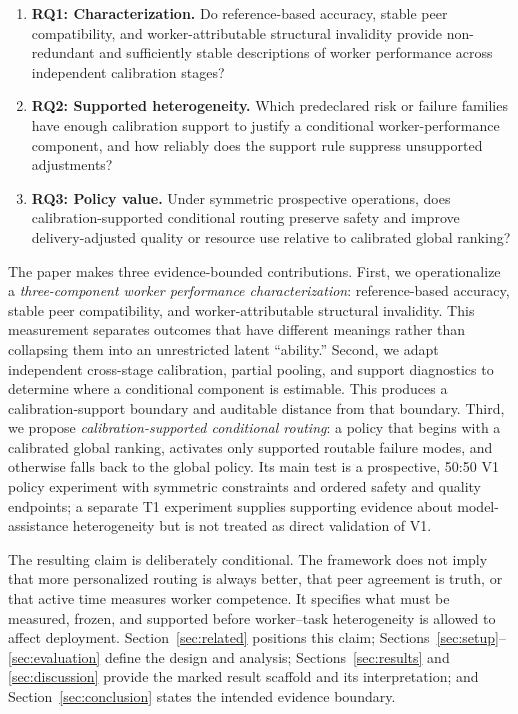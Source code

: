 \begin{enumerate}
  \item \textbf{RQ1: Characterization.} Do reference-based accuracy, stable peer compatibility, and worker-attributable structural invalidity provide non-redundant and sufficiently stable descriptions of worker performance across independent calibration stages?
  \item \textbf{RQ2: Supported heterogeneity.} Which predeclared risk or failure families have enough calibration support to justify a conditional worker-performance component, and how reliably does the support rule suppress unsupported adjustments?
  \item \textbf{RQ3: Policy value.} Under symmetric prospective operations, does calibration-supported conditional routing preserve safety and improve delivery-adjusted quality or resource use relative to calibrated global ranking?
\end{enumerate}

The paper makes three evidence-bounded contributions. First, we operationalize a \emph{three-component worker performance characterization}: reference-based accuracy, stable peer compatibility, and worker-attributable structural invalidity. This measurement separates outcomes that have different meanings rather than collapsing them into an unrestricted latent ``ability.'' Second, we adapt independent cross-stage calibration, partial pooling, and support diagnostics to determine where a conditional component is estimable. This produces a calibration-support boundary and auditable distance from that boundary. Third, we propose \emph{calibration-supported conditional routing}: a policy that begins with a calibrated global ranking, activates only supported routable failure modes, and otherwise falls back to the global policy. Its main test is a prospective, 50:50 V1 policy experiment with symmetric constraints and ordered safety and quality endpoints; a separate T1 experiment supplies supporting evidence about model-assistance heterogeneity but is not treated as direct validation of V1.

The resulting claim is deliberately conditional. The framework does not imply that more personalized routing is always better, that peer agreement is truth, or that active time measures worker competence. It specifies what must be measured, frozen, and supported before worker--task heterogeneity is allowed to affect deployment. Section~\ref{sec:related} positions this claim; Sections~\ref{sec:setup}--\ref{sec:evaluation} define the design and analysis; Sections~\ref{sec:results} and \ref{sec:discussion} provide the marked result scaffold and its interpretation; and Section~\ref{sec:conclusion} states the intended evidence boundary.
